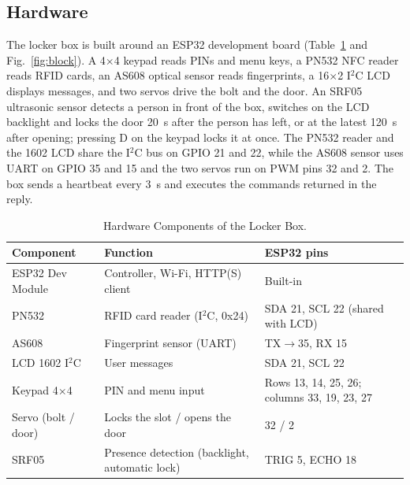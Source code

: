 \documentclass[journal,onecolumn]{IEEEtran}
\begin{document}
\subsection{Hardware}

The locker box is built around an ESP32 development board (Table~\ref{tab:hw} and Fig.~\ref{fig:block}). A 4$\times$4
keypad reads PINs and menu keys, a PN532 NFC reader reads RFID cards, an AS608 optical sensor reads fingerprints, a
16$\times$2 I$^2$C LCD displays messages, and two servos drive the bolt and the door. An SRF05 ultrasonic sensor
detects a person in front of the box, switches on the LCD backlight and locks the door 20~s after the person has left,
or at the latest 120~s after opening; pressing D on the keypad locks it at once. The PN532 reader and the 1602 LCD share
the I$^2$C bus on GPIO 21 and 22, while the AS608 sensor uses UART on GPIO 35 and 15 and the two servos run on PWM pins
32 and 2. The box sends a heartbeat every 3~s and executes the commands returned in the reply.

\begin{table}[!htbp]
\renewcommand{\arraystretch}{1.02}
\centering
\small
\caption{Hardware Components of the Locker Box.}
\label{tab:hw}
\vspace{5pt}
\begin{tabular}{l l l}
\hline
Component & Function & ESP32 pins \\
\hline
ESP32 Dev Module & Controller, Wi-Fi, HTTP(S) client & Built-in \\
PN532 & RFID card reader (I$^2$C, 0x24) & SDA 21, SCL 22 (shared with LCD) \\
AS608 & Fingerprint sensor (UART) & TX$\rightarrow$35, RX 15 \\
LCD 1602 I$^2$C & User messages & SDA 21, SCL 22 \\
Keypad 4$\times$4 & PIN and menu input & Rows 13, 14, 25, 26; columns 33, 19, 23, 27 \\
Servo (bolt / door) & Locks the slot / opens the door & 32 / 2 \\
SRF05 & Presence detection (backlight, automatic lock) & TRIG 5, ECHO 18 \\
\hline
\end{tabular}
\end{table}
\end{document}
